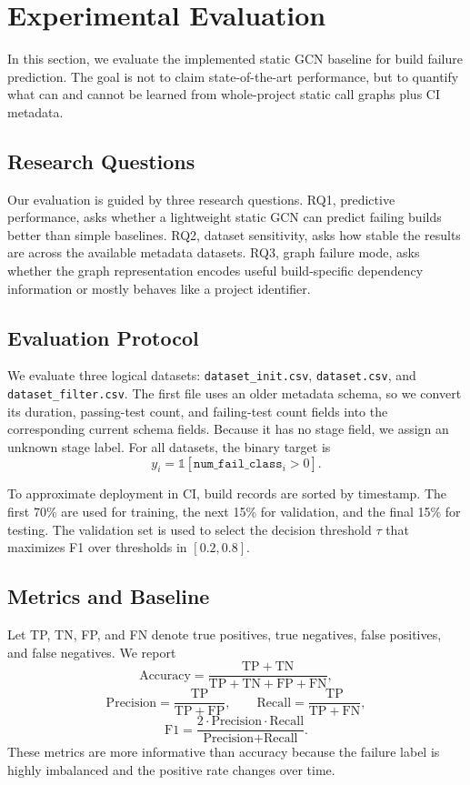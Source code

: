 \section{Experimental Evaluation}
\label{sec:evaluation}

In this section, we evaluate the implemented static GCN baseline for build failure prediction. The goal is not to claim state-of-the-art performance, but to quantify what can and cannot be learned from whole-project static call graphs plus CI metadata.

\subsection{Research Questions}

Our evaluation is guided by three research questions. RQ1, predictive performance, asks whether a lightweight static GCN can predict failing builds better than simple baselines. RQ2, dataset sensitivity, asks how stable the results are across the available metadata datasets. RQ3, graph failure mode, asks whether the graph representation encodes useful build-specific dependency information or mostly behaves like a project identifier.

\subsection{Evaluation Protocol}

We evaluate three logical datasets: \texttt{dataset\_init.csv}, \texttt{dataset.csv}, and \texttt{dataset\_filter.csv}. The first file uses an older metadata schema, so we convert its duration, passing-test count, and failing-test count fields into the corresponding current schema fields. Because it has no stage field, we assign an unknown stage label. For all datasets, the binary target is
\[
y_i=\mathbb{1}[\texttt{num\_fail\_class}_i>0].
\]

To approximate deployment in CI, build records are sorted by timestamp. The first 70\% are used for training, the next 15\% for validation, and the final 15\% for testing. The validation set is used to select the decision threshold $\tau$ that maximizes F1 over thresholds in $[0.2,0.8]$.

\subsection{Metrics and Baseline}

Let TP, TN, FP, and FN denote true positives, true negatives, false positives, and false negatives. We report
\[
\text{Accuracy}=\frac{\mathrm{TP}+\mathrm{TN}}{\mathrm{TP}+\mathrm{TN}+\mathrm{FP}+\mathrm{FN}},
\]
\[
\text{Precision}=\frac{\mathrm{TP}}{\mathrm{TP}+\mathrm{FP}},
\qquad
\text{Recall}=\frac{\mathrm{TP}}{\mathrm{TP}+\mathrm{FN}},
\]
\[
\text{F1}=\frac{2\cdot\text{Precision}\cdot\text{Recall}}{\text{Precision}+\text{Recall}}.
\]
These metrics are more informative than accuracy because the failure label is highly imbalanced and the positive rate changes over time.

